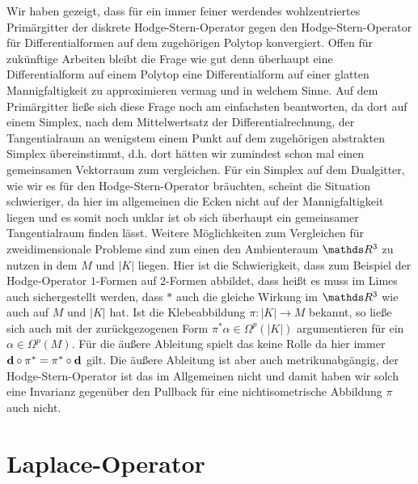 \begin{fazit}
    Wir haben gezeigt, dass für ein immer feiner werdendes wohlzentriertes Primärgitter der diskrete Hodge-Stern-Operator gegen den Hodge-Stern-Operator für Differentialformen auf dem
    zugehörigen Polytop konvergiert.
    Offen für zukünftige Arbeiten bleibt die Frage wie gut denn überhaupt eine Differentialform auf einem Polytop eine Differentialform auf einer glatten Mannigfaltigkeit zu approximieren vermag
    und in welchem Sinne.
    Auf dem Primärgitter ließe sich diese Frage noch am einfachsten beantworten, da dort auf einem Simplex, nach dem Mittelwertsatz der Differentialrechnung, der Tangentialraum an
    wenigstem einem Punkt auf dem zugehörigen abstrakten Simplex übereinstimmt, d.h. dort hätten wir zumindest 
    schon mal einen gemeinsamen Vektorraum zum vergleichen.
    Für ein Simplex auf dem Dualgitter, wie wir es für den Hodge-Stern-Operator bräuchten, scheint die Situation schwieriger, da hier im allgemeinen die Ecken nicht auf der Mannigfaltigkeit
    liegen und es somit noch unklar ist ob sich überhaupt ein gemeinsamer Tangentialraum finden lässt.
    Weitere Möglichkeiten zum Vergleichen für zweidimensionale Probleme sind zum einen den Ambienteraum \( \R^{3} \) zu nutzen in dem \( M \) und \( |K| \) liegen.
    Hier ist die Schwierigkeit, dass zum Beispiel der Hodge-Operator \( 1 \)-Formen auf \( 2 \)-Formen abbildet, dass heißt es muss im Limes auch sichergestellt werden, dass \( * \) auch
    die gleiche Wirkung im \( \R^{3} \) wie auch auf \( M \) und \( |K| \) hat.
    Ist die Klebeabbildung \( \pi:|K|\rightarrow M \) bekannt, so ließe sich auch mit der zurückgezogenen Form \( \pi^{*}\alpha\in\Omega^{p}(|K|) \) argumentieren für ein \(
    \alpha\in\Omega^{p}(M) \).
    Für die äußere Ableitung spielt das keine Rolle da hier immer \( \mathbf{d}\circ\pi^{*} = \pi^{*}\circ\mathbf{d} \) gilt.
    Die äußere Ableitung ist aber auch metrikunabgängig, der Hodge-Stern-Operator ist das im Allgemeinen nicht und damit haben wir solch eine Invarianz gegenüber den Pullback für eine 
    nichtisometrische Abbildung \( \pi \) auch nicht.
  \end{fazit}




\section{Laplace-Operator}
  
